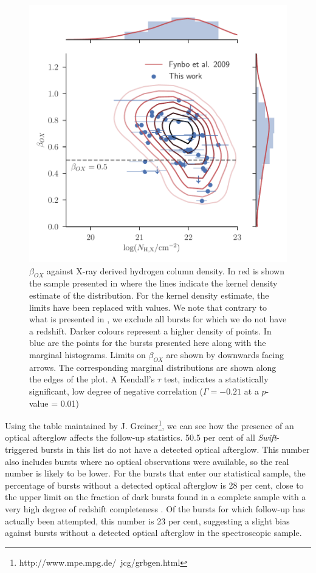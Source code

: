 \documentclass[longauth]{aa}    %
\begin{document}
\begin{figure}[!ht]
	\centerline{\includegraphics[width=\columnwidth]{figures/betaOX.pdf}}
\caption{$\beta_{OX}$ against X-ray derived hydrogen column density. In red is
	shown the sample presented in \citet{Fynbo2009} where the lines indicate the
	kernel density estimate of the distribution. For the kernel density estimate,
	the limits have been replaced with values. We note that contrary to what is
	presented in \citet{Fynbo2009}, we exclude all bursts for which we do not have
	a redshift. Darker colours represent a higher density of points. In blue are the
	points for the bursts presented here along with the marginal histograms. Limits
	on $\beta_{OX}$ are shown by downwards facing arrows. The corresponding
	marginal distributions are shown along the edges of the plot. A Kendall's
	$\tau$ test, indicates a statistically significant, low degree of negative
	correlation ($\Gamma = -0.21$ at a $p$-value = 0.01)} \label{fig:betaOX}
\end{figure}

Using the table maintained by
J. Greiner\footnote{http://www.mpe.mpg.de/~jcg/grbgen.html}, we can see how the
presence of an optical afterglow affects the follow-up statistics. 50.5 per cent
of all \textit{Swift}-triggered bursts in this list do not have a detected
optical afterglow. This number also includes bursts where no optical
observations were available, so the real number is likely to be lower. For the
bursts that enter our statistical sample, the percentage of bursts without a
detected optical afterglow is 28 per cent, close to the upper limit on the
fraction of dark bursts found in a complete sample with a very high degree of
redshift completeness \citep{Melandri2012}. Of the bursts for which follow-up
has actually been attempted, this number is 23 per cent, suggesting a slight
bias against bursts without a detected optical afterglow in the spectroscopic
sample.
\end{document}

